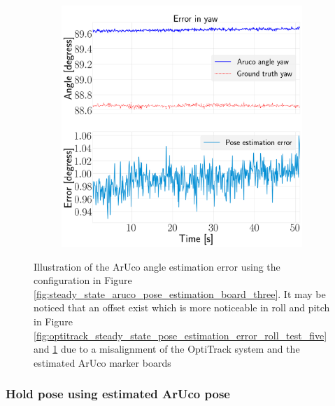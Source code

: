 \documentclass[../Head/report.tex]{subfiles}
\begin{document}
\begin{figure}[H]
\begin{subfigure}[t]{.30\textwidth}
        \caption{}
        \label{fig:optitrack_steady_state_pose_estimation_error_pitch_test_five}
    \end{subfigure}
     \hspace{0.2em}
    \begin{subfigure}[t]{.30\textwidth}
        \centering
        \includegraphics[width=\textwidth]{../Figures/optitrack/steady_aruco_pose_estimation/pose_error_yaw_test1.png}
        \caption{}
        \label{fig:optitrack_steady_state_pose_estimation_error_yaw_test_five}
    \end{subfigure}
    \caption{Illustration of the ArUco angle estimation error using the configuration in Figure \ref{fig:steady_state_aruco_pose_estimation_board_three}. It may be noticed that an offset exist which is more noticeable in roll and pitch in Figure \ref{fig:optitrack_steady_state_pose_estimation_error_roll_test_five} and \ref{fig:optitrack_steady_state_pose_estimation_error_pitch_test_five} due to a misalignment of the OptiTrack system and the estimated ArUco marker boards}
    \label{fig:optitrack_steady_state_pose_estimation_error_ori_test_five}
\end{figure}

\subsubsection{Hold pose using estimated ArUco pose}
\label{sec:optitrack_hold_pose_using_estimated_aruco_pose}
\end{document}
